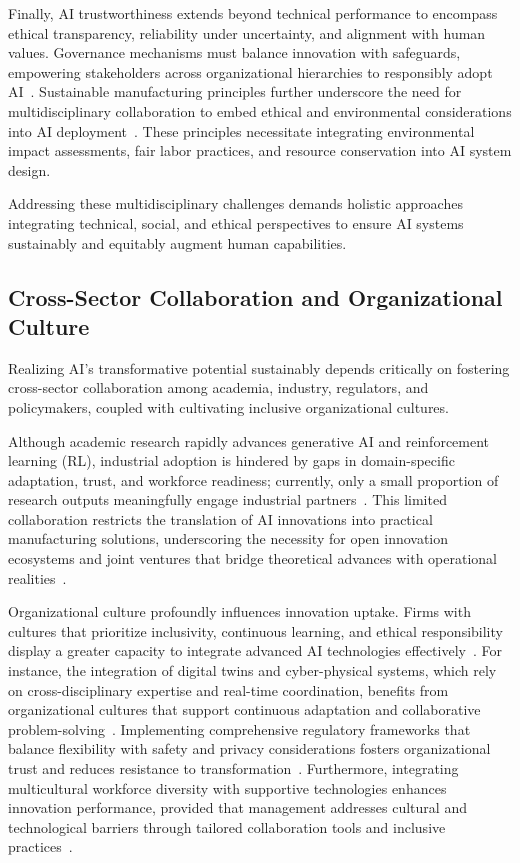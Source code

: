 \documentclass[sigconf]{acmart}
\begin{document}
Finally, AI trustworthiness extends beyond technical performance to encompass ethical transparency, reliability under uncertainty, and alignment with human values. Governance mechanisms must balance innovation with safeguards, empowering stakeholders across organizational hierarchies to responsibly adopt AI~\cite{ref41}. Sustainable manufacturing principles further underscore the need for multidisciplinary collaboration to embed ethical and environmental considerations into AI deployment~\cite{ref41}. These principles necessitate integrating environmental impact assessments, fair labor practices, and resource conservation into AI system design.

Addressing these multidisciplinary challenges demands holistic approaches integrating technical, social, and ethical perspectives to ensure AI systems sustainably and equitably augment human capabilities.

\subsection{Cross-Sector Collaboration and Organizational Culture}

Realizing AI’s transformative potential sustainably depends critically on fostering cross-sector collaboration among academia, industry, regulators, and policymakers, coupled with cultivating inclusive organizational cultures.

Although academic research rapidly advances generative AI and reinforcement learning (RL), industrial adoption is hindered by gaps in domain-specific adaptation, trust, and workforce readiness; currently, only a small proportion of research outputs meaningfully engage industrial partners~\cite{ref7}. This limited collaboration restricts the translation of AI innovations into practical manufacturing solutions, underscoring the necessity for open innovation ecosystems and joint ventures that bridge theoretical advances with operational realities~\cite{ref3}.

Organizational culture profoundly influences innovation uptake. Firms with cultures that prioritize inclusivity, continuous learning, and ethical responsibility display a greater capacity to integrate advanced AI technologies effectively~\cite{ref22,ref27}. For instance, the integration of digital twins and cyber-physical systems, which rely on cross-disciplinary expertise and real-time coordination, benefits from organizational cultures that support continuous adaptation and collaborative problem-solving~\cite{ref22}. Implementing comprehensive regulatory frameworks that balance flexibility with safety and privacy considerations fosters organizational trust and reduces resistance to transformation~\cite{ref3}. Furthermore, integrating multicultural workforce diversity with supportive technologies enhances innovation performance, provided that management addresses cultural and technological barriers through tailored collaboration tools and inclusive practices~\cite{ref24}.
\end{document}
